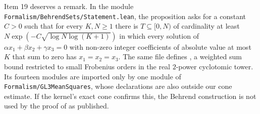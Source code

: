 Item 19 deserves a remark. In the module \texttt{Formalism/BehrendSets/Statement.lean}, the
proposition  
asks for a constant $C>0$ such that for every $K,N\ge1$ there is $T\subseteq[0,N)$ of cardinality at
least $N\exp(-C\sqrt{\log N\log(K+1)})$ in which every solution of
$\alpha x_1+\beta x_2+\gamma x_3=0$ with non-zero integer coefficients of absolute value at most $K$
that sum to zero has $x_1=x_2=x_3$. The same file defines ,
a weighted sum bound restricted to small Frobenius orders in the real $2$-power cyclotomic tower.
Its fourteen modules are imported
only by one module of \texttt{Formalism/GL3MeanSquares}, whose declarations are also outside our cone
estimate. If the kernel's exact cone confirms this, the Behrend construction is not used by the proof
of  as published.

